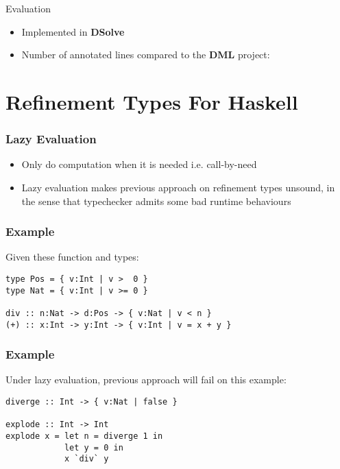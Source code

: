 \documentclass[pdf]{beamer}
\begin{document}
\begin{frame}{Evaluation}
  \begin{itemize}
    \item<+-> Implemented in \textbf{DSolve}
    \item<+-> Number of annotated lines compared to the \textbf{DML} project:
  \end{itemize}
\end{frame}


\section{Refinement Types For Haskell}

\begin{frame}
  \frametitle{Lazy Evaluation}
  \begin{itemize}
    \item Only do computation when it is needed i.e. call-by-need
    \item Lazy evaluation makes previous approach on refinement types unsound,
      in the sense that typechecker admits some bad runtime behaviours
  \end{itemize}
\end{frame}

\begin{frame}[fragile]
  \frametitle{Example}
  Given these function and types:
  \begin{verbatim}
type Pos = { v:Int | v >  0 }
type Nat = { v:Int | v >= 0 }

div :: n:Nat -> d:Pos -> { v:Nat | v < n } 
(+) :: x:Int -> y:Int -> { v:Int | v = x + y }
  \end{verbatim}
\end{frame}

\begin{frame}[fragile]
  \frametitle{Example}
  Under lazy evaluation, previous approach will fail on this example:
  \begin{verbatim}
diverge :: Int -> { v:Nat | false } 

explode :: Int -> Int
explode x = let n = diverge 1 in 
            let y = 0 in 
            x `div` y
  \end{verbatim}
\end{frame}
\end{document}
